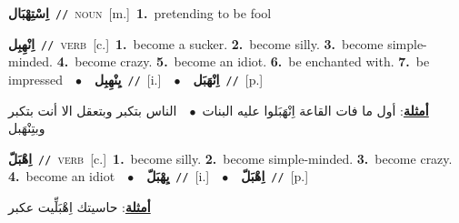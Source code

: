 \documentclass[10pt,a4paper,twoside]{article} %
\begin{document}
\begin{multicols}{2}
{{{{{{\setlength\topsep{0pt}\textbf{\foreignlanguage{arabic}{اِسْتِهْبَال}}\ {\color{gray}\texttt{//}\color{black}}\ \textsc{noun}\ [m.]\ \textbf{1.}~pretending to be fool\ 

{\setlength\topsep{0pt}\textbf{\foreignlanguage{arabic}{اِنْهِبِل}}\ {\color{gray}\texttt{//}\color{black}}\ \textsc{verb}\ [c.]\ \textbf{1.}~become a sucker.  \textbf{2.}~become silly.  \textbf{3.}~become simple-minded.  \textbf{4.}~become crazy.  \textbf{5.}~become an idiot.  \textbf{6.}~be enchanted with.  \textbf{7.}~be impressed\ \ $\bullet$\ \ \setlength\topsep{0pt}\textbf{\foreignlanguage{arabic}{يِنْهِبِل}}\ {\color{gray}\texttt{//}\color{black}}\ [i.]\ \ $\bullet$\ \ \setlength\topsep{0pt}\textbf{\foreignlanguage{arabic}{اِنْهَبَل}}\ {\color{gray}\texttt{//}\color{black}}\ [p.]\  \begin{flushright}\color{gray}\foreignlanguage{arabic}{\textbf{\underline{\foreignlanguage{arabic}{أمثلة}}}: أول ما فات القاعة اِنْهَبَلوا عليه البنات\ $\bullet$\ \  الناس بتكبر وبتعقل الا أنت بتكبر وبتِنْهَبل}\end{flushright}\color{black}} \vspace{2mm}

{\setlength\topsep{0pt}\textbf{\foreignlanguage{arabic}{اِهْبَلّ}}\ {\color{gray}\texttt{//}\color{black}}\ \textsc{verb}\ [c.]\ \textbf{1.}~become silly.  \textbf{2.}~become simple-minded.  \textbf{3.}~become crazy.  \textbf{4.}~become an idiot\ \ $\bullet$\ \ \setlength\topsep{0pt}\textbf{\foreignlanguage{arabic}{يِهْبَلّ}}\ {\color{gray}\texttt{//}\color{black}}\ [i.]\ \ $\bullet$\ \ \setlength\topsep{0pt}\textbf{\foreignlanguage{arabic}{اِهْبَلّ}}\ {\color{gray}\texttt{//}\color{black}}\ [p.]\  \begin{flushright}\color{gray}\foreignlanguage{arabic}{\textbf{\underline{\foreignlanguage{arabic}{أمثلة}}}: حاسيتك اِهْبَلِّيت عكبر}\end{flushright}\color{black}} \vspace{2mm}

}}}}}}
\end{multicols}
\end{document}
